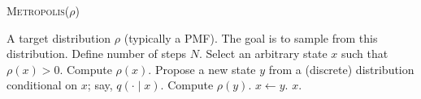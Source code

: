 \documentclass[12pt,a4paper]{article}
\begin{document}
	\begin{algorithm}[H]
		\caption{\textsc{Metropolis-Hastings Algorithm (Discrete Version)}}
		\label{alg:metropolis}
		\textsc{Metropolis}(\(\rho\))
		\begin{algorithmic}[1]
			\REQUIRE A target distribution \(\rho\) (typically a PMF). The goal is to sample from this distribution.
			\STATE Define number of steps \(N\).
			\STATE Select an arbitrary state \(x\) such that \(\rho(x) > 0\).
			\STATE Compute \(\rho(x)\).
			\STATE Propose a new state \(y\) from a (discrete) distribution conditional on \(x\); say, \(q(\cdot\mid x)\).
			\STATE Compute \(\rho(y)\).
			\STATE \(x \gets y\).
			\ENDIF
			\ENDFOR
			\RETURN \(x\).
		\end{algorithmic}
	\end{algorithm}
\end{document}
